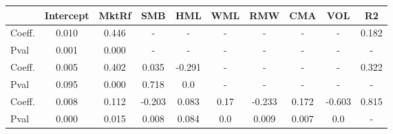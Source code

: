\begin{tabular}{lccccccccc}
\toprule
{} &  Intercept &  MktRf &    SMB &    HML &   WML &    RMW &    CMA &    VOL &     R2 \\
\midrule
Coeff.  &      0.010 &  0.446 &      - &      - &     - &      - &      - &      - &  0.182 \\
Pval    &      0.001 &  0.000 &      - &      - &     - &      - &      - &      - &      - \\
Coeff.  &      0.005 &  0.402 &  0.035 & -0.291 &     - &      - &      - &      - &  0.322 \\
Pval    &      0.095 &  0.000 &  0.718 &    0.0 &     - &      - &      - &      - &      - \\
Coeff.  &      0.008 &  0.112 & -0.203 &  0.083 &  0.17 & -0.233 &  0.172 & -0.603 &  0.815 \\
Pval    &      0.000 &  0.015 &  0.008 &  0.084 &   0.0 &  0.009 &  0.007 &    0.0 &      - \\
\bottomrule
\end{tabular}
